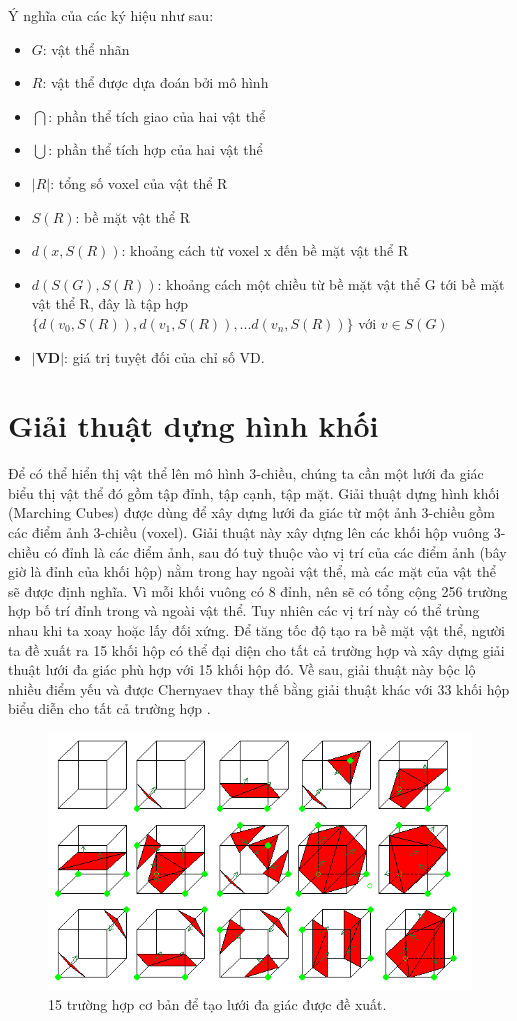 Ý nghĩa của các ký hiệu như sau:
\begin{itemize}
    \item $G$: vật thể nhãn
    \item $R$: vật thể được dựa đoán bởi mô hình
    \item $\bigcap$: phần thể tích giao của hai vật thể
    \item $\bigcup$: phần thể tích hợp của hai vật thể
    \item $|R|$: tổng số voxel của vật thể R
    \item $S(R)$: bề mặt vật thể R
    \item $d(x,S(R))$: khoảng cách từ voxel x đến bề mặt vật thể R
    \item $d(S(G),S(R))$: khoảng cách một chiều từ bề mặt vật thể G tới bề mặt vật thể R, đây là tập hợp $\{ d(v_{0}, S(R)), d(v_{1}, S(R)),...d(v_{n}, S(R)) \} $ với $v \in S(G) $
    \item $\textbf{|VD|}$: giá trị tuyệt đối của chỉ số VD.
\end{itemize}

\section{Giải thuật dựng hình khối}
Để có thể hiển thị vật thể lên mô hình 3-chiều, chúng ta cần một lưới đa giác biểu thị vật thể đó gồm tập đỉnh, tập cạnh, tập mặt. Giải thuật dựng hình khối (Marching Cubes) được dùng để xây dựng lưới đa giác từ một ảnh 3-chiều gồm các điểm ảnh 3-chiều (voxel). Giải thuật này xây dựng lên các khối hộp vuông 3-chiều có đỉnh là các điểm ảnh, sau đó tuỳ thuộc vào vị trí của các điểm ảnh (bây giờ là đỉnh của khối hộp) nằm trong hay ngoài vật thể, mà các mặt của vật thể sẽ được định nghĩa. Vì mỗi khối vuông có 8 đỉnh, nên sẽ có tổng cộng 256 trường hợp bố trí đỉnh trong và ngoài vật thể. Tuy nhiên các vị trí này có thể trùng nhau khi ta xoay hoặc lấy đối xứng. Để tăng tốc độ tạo ra bề mặt vật thể, người ta đề xuất ra 15 khối hộp có thể đại diện cho tất cả trường hợp và xây dựng giải thuật lưới đa giác phù hợp với 15 khối hộp đó. Về sau, giải thuật này bộc lộ nhiều điểm yếu và được Chernyaev thay thế bằng giải thuật khác với 33 khối hộp biểu diễn cho tất cả trường hợp \cite{marching_cube}.

\begin{figure}[h]
\centering
    \includegraphics[totalheight=4cm]{Images/marching_15.png}
    \caption{15 trường hợp cơ bản để tạo lưới đa giác được đề xuất.}
    \label{marching_15}
\end{figure}
